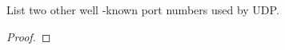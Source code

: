 \documentclass[../../main.tex]{subfiles}
\begin{document}
\begin{wts}
List two other well -known port numbers used by UDP.
\end{wts}
\begin{proof}

\end{proof}
\end{document}
